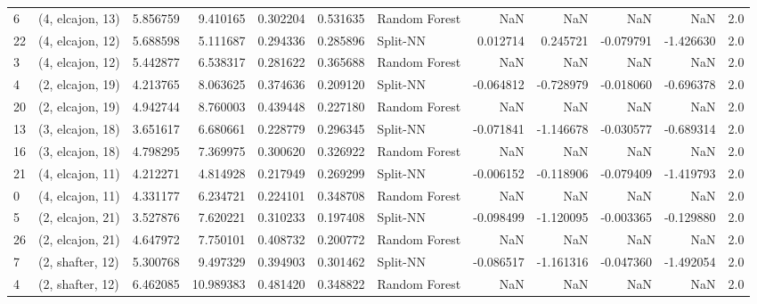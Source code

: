 \begin{tabular}{llrrrrlrrrrr}
6  &  (4, elcajon, 13) &  5.856759 &   9.410165 &   0.302204 &  0.531635 &  Random Forest &             NaN &           NaN &            NaN &          NaN &            2.0 \\
22 &  (4, elcajon, 12) &  5.688598 &   5.111687 &   0.294336 &  0.285896 &       Split-NN &        0.012714 &      0.245721 &      -0.079791 &    -1.426630 &            2.0 \\
3  &  (4, elcajon, 12) &  5.442877 &   6.538317 &   0.281622 &  0.365688 &  Random Forest &             NaN &           NaN &            NaN &          NaN &            2.0 \\
4  &  (2, elcajon, 19) &  4.213765 &   8.063625 &   0.374636 &  0.209120 &       Split-NN &       -0.064812 &     -0.728979 &      -0.018060 &    -0.696378 &            2.0 \\
20 &  (2, elcajon, 19) &  4.942744 &   8.760003 &   0.439448 &  0.227180 &  Random Forest &             NaN &           NaN &            NaN &          NaN &            2.0 \\
13 &  (3, elcajon, 18) &  3.651617 &   6.680661 &   0.228779 &  0.296345 &       Split-NN &       -0.071841 &     -1.146678 &      -0.030577 &    -0.689314 &            2.0 \\
16 &  (3, elcajon, 18) &  4.798295 &   7.369975 &   0.300620 &  0.326922 &  Random Forest &             NaN &           NaN &            NaN &          NaN &            2.0 \\
21 &  (4, elcajon, 11) &  4.212271 &   4.814928 &   0.217949 &  0.269299 &       Split-NN &       -0.006152 &     -0.118906 &      -0.079409 &    -1.419793 &            2.0 \\
0  &  (4, elcajon, 11) &  4.331177 &   6.234721 &   0.224101 &  0.348708 &  Random Forest &             NaN &           NaN &            NaN &          NaN &            2.0 \\
5  &  (2, elcajon, 21) &  3.527876 &   7.620221 &   0.310233 &  0.197408 &       Split-NN &       -0.098499 &     -1.120095 &      -0.003365 &    -0.129880 &            2.0 \\
26 &  (2, elcajon, 21) &  4.647972 &   7.750101 &   0.408732 &  0.200772 &  Random Forest &             NaN &           NaN &            NaN &          NaN &            2.0 \\
7  &  (2, shafter, 12) &  5.300768 &   9.497329 &   0.394903 &  0.301462 &       Split-NN &       -0.086517 &     -1.161316 &      -0.047360 &    -1.492054 &            2.0 \\
4  &  (2, shafter, 12) &  6.462085 &  10.989383 &   0.481420 &  0.348822 &  Random Forest &             NaN &           NaN &            NaN &          NaN &            2.0 \\

\end{tabular}
